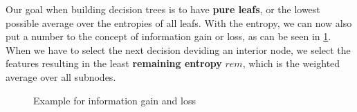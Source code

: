 Our goal when building decision trees is to have \textbf{pure leafs}, or the lowest possible average over the entropies of all leafs. With the entropy, we can now also put a number to the concept of information gain or loss, as can be seen in \ref{fig:3_information_gain_example}. When we have to select the next decision deviding an interior node, we select the features resulting in the least \textbf{remaining entropy} $rem$, which is the weighted average over all subnodes.

\begin{figure}[h]
  \centering
  \caption{Example for information gain and loss}
  \label{fig:3_information_gain_example}
\end{figure}
